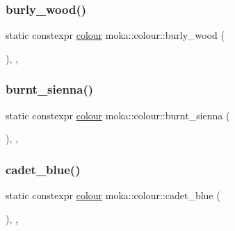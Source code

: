 \subsubsection{\texorpdfstring{burly\_wood()}{burly\_wood()}}
{\footnotesize\ttfamily static constexpr \mbox{\hyperlink{classmoka_1_1colour}{colour}} moka\+::colour\+::burly\+\_\+wood (\begin{DoxyParamCaption}{ }\end{DoxyParamCaption})\hspace{0.3cm}{\ttfamily [inline]}, {\ttfamily [static]}, {\ttfamily [noexcept]}}

\mbox{\label{classmoka_1_1colour_adf150ab92519483a781f5f42e5161284}} 
\subsubsection{\texorpdfstring{burnt\_sienna()}{burnt\_sienna()}}
{\footnotesize\ttfamily static constexpr \mbox{\hyperlink{classmoka_1_1colour}{colour}} moka\+::colour\+::burnt\+\_\+sienna (\begin{DoxyParamCaption}{ }\end{DoxyParamCaption})\hspace{0.3cm}{\ttfamily [inline]}, {\ttfamily [static]}, {\ttfamily [noexcept]}}

\mbox{\label{classmoka_1_1colour_aa86055bbe26e45c22cd34985d40bb387}} 
\subsubsection{\texorpdfstring{cadet\_blue()}{cadet\_blue()}}
{\footnotesize\ttfamily static constexpr \mbox{\hyperlink{classmoka_1_1colour}{colour}} moka\+::colour\+::cadet\+\_\+blue (\begin{DoxyParamCaption}{ }\end{DoxyParamCaption})\hspace{0.3cm}{\ttfamily [inline]}, {\ttfamily [static]}, {\ttfamily [noexcept]}}

\mbox{\label{classmoka_1_1colour_aab7da28ff616de53d7480c280025a9ce}} 
